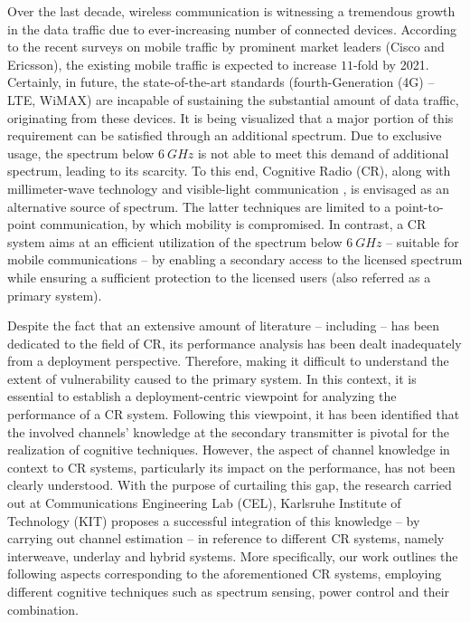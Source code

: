 
\vspace{-1.7cm}

Over the last decade, wireless communication is witnessing a tremendous growth in the data traffic due to ever-increasing number of connected devices. According to the recent surveys on mobile traffic by prominent market leaders (Cisco \cite{CISCO14} and Ericsson\cite{Eric15}), the existing mobile traffic is expected to increase $11$-fold  by 2021. Certainly, in future, the state-of-the-art standards (fourth-Generation (4G) -- LTE, WiMAX) are incapable of sustaining the substantial amount of data traffic, originating from these devices. It is being visualized that a major portion of this requirement can be satisfied through an additional spectrum. Due to exclusive usage, the spectrum below $\SI{6}{GHz}$ is not able to meet this demand of additional spectrum, leading to its scarcity. To this end, Cognitive Radio (CR), along with millimeter-wave technology \cite{Rapp13} and visible-light communication \cite{Wu14}, is envisaged as an alternative source of spectrum. The latter techniques are limited to a point-to-point communication, by which mobility is compromised. In contrast, a CR system aims at an efficient utilization of the spectrum below $\SI{6}{GHz}$ -- suitable for mobile communications -- by enabling a secondary access to the licensed spectrum while ensuring a sufficient protection to the licensed users (also referred as a primary system).

Despite the fact that an extensive amount of literature -- including \cite{Liang08, Kang209, Kang09} -- has been dedicated to the field of CR, its performance analysis has been dealt inadequately from a deployment perspective. Therefore, making it difficult to understand the extent of vulnerability caused to the primary system. In this context, it is essential to establish a deployment-centric viewpoint for analyzing the performance of a CR system. Following this viewpoint, it has been identified that the involved channels' knowledge at the secondary transmitter is pivotal for the realization of cognitive techniques. However, the aspect of channel knowledge in context to CR systems, particularly its impact on the performance, has not been clearly understood. With the purpose of curtailing this gap, the research carried out at Communications Engineering Lab (CEL), Karlsruhe Institute of Technology (KIT) proposes a successful integration of this knowledge -- by carrying out channel estimation -- in reference to different CR systems, namely interweave, underlay and hybrid systems. More specifically, our work outlines the following aspects corresponding to the aforementioned CR systems, employing different cognitive techniques such as spectrum sensing, power control and their combination.

